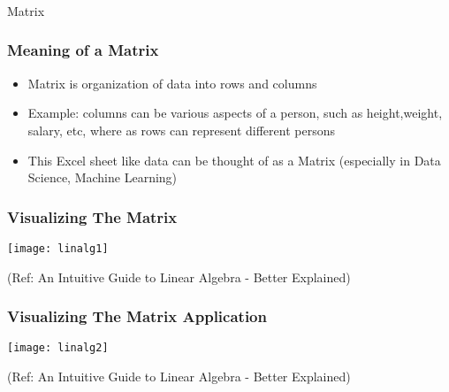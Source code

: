  \begin{frame}[fragile]\frametitle{}
\begin{center}
{\Large Matrix}
\end{center}
\end{frame}


\begin{frame}[fragile]\frametitle{Meaning of a Matrix}

 \begin{itemize}
  \item Matrix is organization of data into rows and columns
  \item Example: columns can be various aspects of a person, such as height,weight, salary, etc, where as rows can represent different persons 
  \item This Excel sheet like data can be thought of as a Matrix (especially in Data Science, Machine Learning)
 \end{itemize}

\end{frame}

\begin{frame}[fragile]\frametitle{Visualizing The Matrix}

\begin{center}
\texttt{[image: linalg1]}
\end{center}


{\tiny (Ref: An Intuitive Guide to Linear Algebra - Better Explained)}

\end{frame}

\begin{frame}[fragile]\frametitle{Visualizing The Matrix Application}

\begin{center}
\texttt{[image: linalg2]}
\end{center}


{\tiny (Ref: An Intuitive Guide to Linear Algebra - Better Explained)}

\end{frame}

